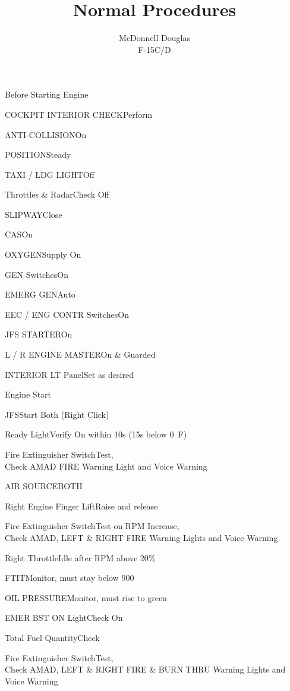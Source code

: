 \documentclass[sim-use]{checklist}
\title{Normal Procedures}
\subtitle{McDonnell Douglas \\ F-15C/D}
\begin{document}
\begin{checklist}{Before Starting Engine}
	\item{COCKPIT INTERIOR CHECK}{Perform}
	 {
		\item{ANTI-COLLISION}{On}
		\item{POSITION}{Steady}
		\item{TAXI / LDG LIGHT}{Off}
	}
	\item{Throttles \& Radar}{Check Off}
	\item{SLIPWAY}{Close}
	\item{CAS}{On}
	\item{OXYGEN}{Supply On}
	 {
		\item{GEN Switches}{On}
		\item{EMERG GEN}{Auto}
		\item{EEC / ENG CONTR Switches}{On}
		\item{JFS STARTER}{On}
		\item{L / R ENGINE MASTER}{On \& Guarded}
	}
	\item{INTERIOR LT Panel}{Set as desired}
\end{checklist}

\begin{checklist}{Engine Start}
	\item{JFS}{Start Both (Right Click)}
	\item{Ready Light}{Verify On within 10s (15s below 0\degree\ F)}
	\item{Fire Extinguisher Switch}{Test,\\Check AMAD FIRE Warning Light and Voice Warning}
	\item{AIR SOURCE}{BOTH}
	 {
		\item{Right Engine Finger Lift}{Raise and release}
		\item{Fire Extinguisher Switch}{Test on RPM Increase,\\Check AMAD, LEFT \& RIGHT FIRE Warning Lights and Voice Warning}
		\item{Right Throttle}{Idle after RPM above 20\%}
		\item{FTIT}{Monitor, must stay below 900}
		\item{OIL PRESSURE}{Monitor, must rise to green}
	}
	\item{EMER BST ON Light}{Check On}
	\item{Total Fuel Quantity}{Check}
	\item{Fire Extinguisher Switch}{Test,\\Check AMAD, LEFT \& RIGHT FIRE \& BURN THRU Warning Lights and Voice Warning}
\end{checklist}
\end{document}
